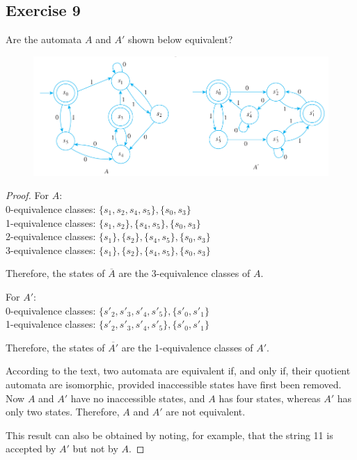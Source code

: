 \documentclass[14pt]{extarticle}
\begin{document}
\subsection{Exercise 9}
Are the automata \(A\) and \(A'\) shown below equivalent?

\begin{figure}[ht!]
    \centering
    \includegraphics[scale=0.5]{../images/12.3.9.png}
\end{figure}

\begin{proof}
    For \(A\): \\
    0-equivalence classes: \(\{s_1, s_2, s_4, s_5\}, \{s_0, s_3\}\) \\
    1-equivalence classes: \(\{s_1, s_2\}, \{s_4, s_5\}, \{s_0, s_3\}\) \\
    2-equivalence classes: \(\{s_1\}, \{s_2\}, \{s_4, s_5\}, \{s_0, s_3\}\) \\
    3-equivalence classes: \(\{s_1\}, \{s_2\}, \{s_4, s_5\}, \{s_0, s_3\}\)

    Therefore, the states of \(\overline{A}\) are the 3-equivalence classes of \(A\).

    For \(A'\): \\
    0-equivalence classes: \(\{s'_2, s'_3, s'_4, s'_5\}, \{s'_0, s'_1\}\) \\
    1-equivalence classes: \(\{s'_2, s'_3, s'_4, s'_5\}, \{s'_0, s'_1\}\)

    Therefore, the states of \(\overline{A'}\) are the 1-equivalence classes of \(A'\).

    According to the text, two automata are equivalent if, and only if, their quotient automata are isomorphic, provided
    inaccessible states have first been removed. Now \(A\) and \(A'\) have no inaccessible states, and \(A\) has four states,
    whereas \(A'\) has only two states. Therefore, \(A\) and \(A'\) are not equivalent.

    This result can also be obtained by noting, for example, that the string 11 is accepted by \(A'\) but not by \(A\).
\end{proof}
\end{document}
